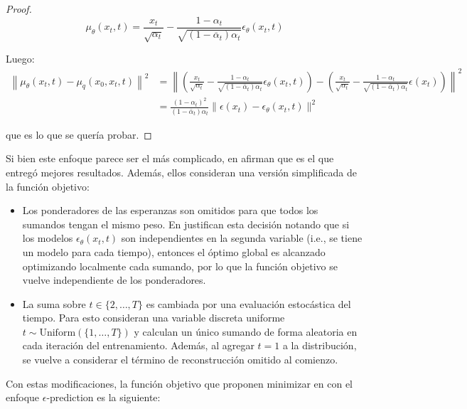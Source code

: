 \begin{proof}
    \begin{equation}
        \mu_\theta(x_t,t) = \frac{x_t}{\sqrt{\alpha_t}} - \frac{1-\alpha_t}{\sqrt{(1-\overline{\alpha}_t)\alpha_t}}\epsilon_\theta(x_t,t)
    \end{equation}

    Luego:
    \begin{align}
        \left\| \mu_\theta(x_t,t) - \mu_q(x_0,x_t,t) \right\|^2 & = \left\| \left(\frac{x_t}{\sqrt{\alpha_t}} - \frac{1-\alpha_t}{\sqrt{(1-\overline{\alpha}_t)\alpha_t}}\epsilon_\theta(x_t,t)\right) - \left(\frac{x_t}{\sqrt{\alpha_t}} - \frac{1-\alpha_t}{\sqrt{(1-\overline{\alpha}_t)\alpha_t}}\epsilon(x_t)\right) \right\|^2 \\
                                                                & = \frac{(1-\alpha_t)^2}{(1-\bar\alpha_t)\alpha_t} \| \epsilon(x_t) - \epsilon_\theta(x_t,t) \|^2
    \end{align}

    que es lo que se quería probar.
\end{proof}

Si bien este enfoque parece ser el más complicado, en \cite{ho2020denoising} afirman que es el que entregó mejores resultados. Además, ellos consideran una versión simplificada de la función objetivo:

\begin{itemize}
    \item Los ponderadores de las esperanzas son omitidos para que todos los sumandos tengan el mismo peso. En \cite{song2022denoising} justifican esta decisión notando que si los modelos $\epsilon_\theta(x_t,t)$ son independientes en la segunda variable (i.e., se tiene un modelo para cada tiempo), entonces el óptimo global es alcanzado optimizando localmente cada sumando, por lo que la función objetivo se vuelve independiente de los ponderadores.
    \item La suma sobre $t\in\{2,\ldots,T\}$ es cambiada por una evaluación estocástica del tiempo. Para esto consideran una variable discreta uniforme $t\sim\text{Uniform}\left(\{1,\ldots,T\}\right)$ y calculan un único sumando de forma aleatoria en cada iteración del entrenamiento. Además, al agregar $t=1$ a la distribución, se vuelve a considerar el término de reconstrucción omitido al comienzo.
\end{itemize}

Con estas modificaciones, la función objetivo que proponen minimizar en \cite{ho2020denoising} con el enfoque $\epsilon$-prediction es la siguiente:

